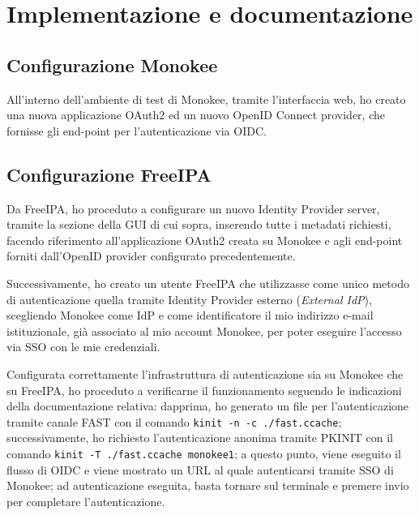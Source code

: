 
\chapter{Implementazione e documentazione}
\label{cap:implementazione-documentazione}



\section{Configurazione Monokee}
All'interno dell'ambiente di test di Monokee, tramite l'interfaccia web, ho creato una nuova applicazione OAuth2 ed un nuovo OpenID Connect provider, che fornisse gli end-point per l'autenticazione via OIDC.


\section{Configurazione FreeIPA}
Da FreeIPA, ho proceduto a configurare un nuovo Identity Provider server, tramite la sezione della GUI di cui sopra, inserendo tutte i metadati richiesti, facendo riferimento all'applicazione OAuth2 creata su Monokee e agli end-point forniti dall'OpenID provider configurato precedentemente.

Successivamente, ho creato un utente FreeIPA che utilizzasse come unico metodo di autenticazione quella tramite Identity Provider esterno (\emph{External IdP}), scegliendo Monokee come IdP e come identificatore il mio indirizzo e-mail istituzionale, già associato al mio account Monokee, per poter eseguire l'accesso via SSO con le mie credenziali.  

Configurata correttamente l'infrastruttura di autenticazione sia su Monokee che su FreeIPA, ho proceduto a verificarne il funzionamento seguendo le indicazioni della documentazione relativa: dapprima, ho generato un file per l'autenticazione tramite canale FAST con il comando \texttt{kinit -n -c ./fast.ccache}; successivamente, ho richiesto l'autenticazione anonima tramite PKINIT con il comando \texttt{kinit -T ./fast.ccache monokee1}; a questo punto, viene eseguito il flusso di OIDC e viene mostrato un URL al quale autenticarsi tramite SSO di Monokee; ad autenticazione eseguita, basta tornare sul terminale e premere invio per completare l'autenticazione.

